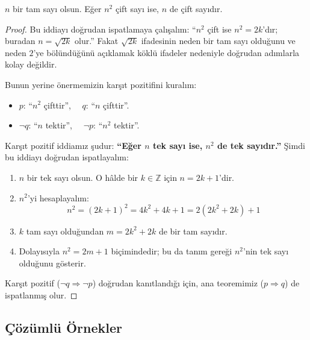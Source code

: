 \begin{theorem}
$n$ bir tam sayı olsun. Eğer $n^2$ çift sayı ise, $n$ de çift sayıdır.
\end{theorem}
\begin{proof}
Bu iddiayı doğrudan ispatlamaya çalışalım: ``$n^2$ çift ise $n^2 = 2k$'dır; buradan $n = \sqrt{2k}$ olur.'' Fakat $\sqrt{2k}$ ifadesinin neden bir tam sayı olduğunu ve neden $2$'ye bölündüğünü açıklamak köklü ifadeler nedeniyle doğrudan adımlarla kolay değildir.

Bunun yerine önermemizin karşıt pozitifini kuralım:
\begin{itemize}
  \item $p$: ``$n^2$ çifttir'', $\quad q$: ``$n$ çifttir''.
  \item $\neg q$: ``$n$ tektir'', $\quad \neg p$: ``$n^2$ tektir''.
\end{itemize}
Karşıt pozitif iddiamız şudur: \textbf{``Eğer $n$ tek sayı ise, $n^2$ de tek sayıdır.''} Şimdi bu iddiayı doğrudan ispatlayalım:
\begin{enumerate}
  \item $n$ bir tek sayı olsun. O hâlde bir $k \in \mathbb{Z}$ için $n = 2k + 1$'dir.
  \item $n^2$'yi hesaplayalım:
  \[ n^2 = (2k + 1)^2 = 4k^2 + 4k + 1 = 2(2k^2 + 2k) + 1 \]
  \item $k$ tam sayı olduğundan $m = 2k^2 + 2k$ de bir tam sayıdır.
  \item Dolayısıyla $n^2 = 2m + 1$ biçimindedir; bu da tanım gereği $n^2$'nin tek sayı olduğunu gösterir.
\end{enumerate}
Karşıt pozitif ($\neg q \Rightarrow \neg p$) doğrudan kanıtlandığı için, ana teoremimiz ($p \Rightarrow q$) de ispatlanmış olur.
\end{proof}

\subsection{Çözümlü Örnekler}

